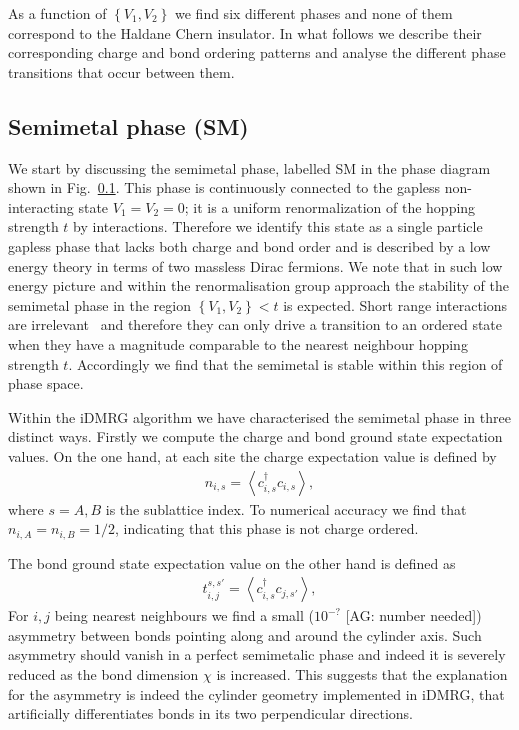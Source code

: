 \documentclass[aps,prx,10pt,twocolumn,floatfix,superscriptaddress,showpacs,numerical,footinbib]{revtex4-1}
\newcommand{\noteAG}[1]{{\color{blue} [AG: #1]}}
\begin{document}
%
As a function of $\left\lbrace V_{1},V_{2}\right\rbrace$ we find six different phases and none of them correspond to the Haldane Chern insulator.
%
In what follows we describe their corresponding charge and bond ordering patterns and analyse the different phase transitions that occur between them.
%


%
\subsection{Semimetal phase (SM)}
%
We start by discussing the semimetal phase, labelled SM in the phase diagram shown in Fig.~\ref{}.
%
This phase is continuously connected to the gapless non-interacting state $V_{1}=V_{2}=0$; 
it is a uniform renormalization of the hopping strength $t$ by interactions.
%
Therefore we identify this state as a single particle gapless phase that lacks both charge and bond order and is described by a low energy theory in terms of two massless Dirac fermions.
%
We note that in such low energy picture and within the renormalisation group approach the stability of the semimetal phase in the region $\left\lbrace V_{1},V_{2}\right\rbrace < t$ is expected.
%
Short range interactions are irrelevant~\cite{Shankar?} and therefore they can only drive a transition to an ordered state when they have a magnitude comparable to the nearest neighbour hopping strength $t$.
%
Accordingly we find that the semimetal is stable within this region of phase space.


Within the iDMRG algorithm we have characterised the semimetal phase in three distinct ways.
%
Firstly we compute the charge and bond ground state expectation values.
%
On the one hand, at each site the charge expectation value is defined by 
%
\begin{eqnarray}
\label{eq:charge}
n_{i,s}=\left\langle c^{\dagger}_{i,s}c_{i,s}\right\rangle,  
\end{eqnarray}
%
where $s=A,B$ is the sublattice index.
%
To numerical accuracy we find that $n_{i,A}=n_{i,B}=1/2$, indicating that this phase is not charge ordered.
%

The bond ground state expectation value on the other hand is defined as
%
\begin{eqnarray}
\label{eq:bond}
t^{s,s'}_{i,j}=\left\langle c^{\dagger}_{i,s}c_{j,s'}\right\rangle,  
\end{eqnarray}
%
For $i,j$ being nearest neighbours we find a small ($10^{-?}$ \noteAG{number needed}) asymmetry
between bonds pointing along and around the cylinder axis.
%
Such asymmetry should vanish in a perfect semimetalic phase and indeed it is severely reduced as the bond dimension $\chi$ is increased.
% 
This suggests that the explanation for the asymmetry is indeed the cylinder geometry implemented in iDMRG, that artificially differentiates bonds in its two perpendicular directions.
%
\end{document}

